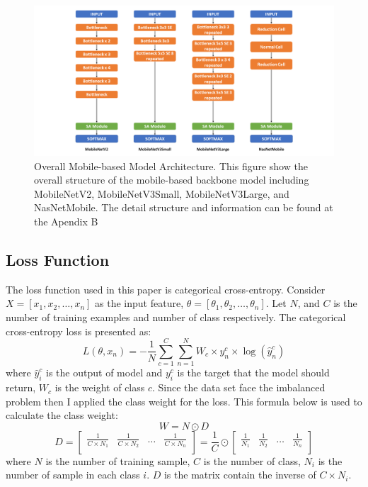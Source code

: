 \documentclass[sensors,article,submit,pdftex,moreauthors]{Definitions/mdpi}
\begin{document}
\begin{figure}[H]
	\centering
	\includegraphics[width=1\linewidth]{Definitions/Mobile Model Structure}
	\caption{Overall Mobile-based Model Architecture. This figure show the overall structure of the mobile-based backbone model including MobileNetV2, MobileNetV3Small, MobileNetV3Large, and NasNetMobile. The detail structure and information can be found at the Apendix B}
	\label{fig:mobile-model-structure}
\end{figure}

\subsection{Loss Function}
The loss function used in this paper is categorical cross-entropy. Consider $X = [x_1, x_2, \dots, x_n]$ as the input feature, $\theta = [\theta_1, \theta_2, \dots, \theta_n]$. Let $N$, and $C$ is the number of training examples and number of class respectively. The categorical cross-entropy loss is presented as:
\[L(\theta, x_n) = -\frac{1}{N}\sum_{c=1}^{C}\sum_{n=1}^{N}W_c\times y^c_n \times \log(\hat{y}^c_n)\]
where $\hat{y}^c_i$  is the output of model and $y^c_i$ is the target that the model should return, $W_c$ is the weight of class $c$. Since the data set face the imbalanced problem then I applied the class weight for the loss. This formula below is used to calculate the class weight:
\[W = N \odot D\]
\[D = \begin{bmatrix}
	\frac{1}{C \times  N_1} & \frac{1}{C \times  N_2} & \dots & \frac{1}{C \times  N_n}\\
\end{bmatrix} = \frac{1}{C} \odot \begin{bmatrix}
	\frac{1}{N_1} & \frac{1}{N_2} & \dots & \frac{1}{N_n}\\
\end{bmatrix}\]
where $N$ is the number of training sample, $C$ is the number of class, $N_i$ is the number of sample in each class $i$. $D$ is the matrix contain the inverse of $C \times N_i$. 
\end{document}
